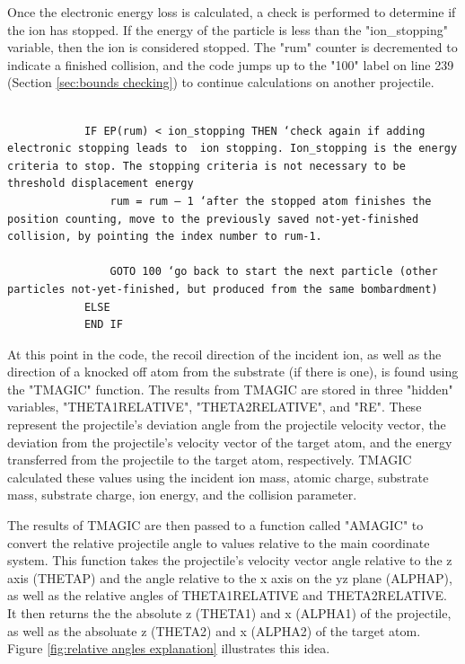 \documentclass[10pt, reqno]{exam}
\begin{document}
Once the electronic energy loss is calculated, a check is performed to determine if the ion has stopped. If the energy of the particle is less than the "ion\_stopping" variable, then the ion is considered stopped. The "rum" counter is decremented to indicate a finished collision, and the code jumps up to the "100" label on line 239 (Section \ref{sec:bounds checking}) to continue calculations on another projectile.

\begin{verbatim}   

            IF EP(rum) < ion_stopping THEN ‘check again if adding electronic stopping leads to  ion stopping. Ion_stopping is the energy criteria to stop. The stopping criteria is not necessary to be threshold displacement energy
                rum = rum – 1 ‘after the stopped atom finishes the position counting, move to the previously saved not-yet-finished collision, by pointing the index number to rum-1. 
    
                GOTO 100 ‘go back to start the next particle (other particles not-yet-finished, but produced from the same bombardment)
            ELSE
            END IF
\end{verbatim}

At this point in the code, the recoil direction of the incident ion, as well as the direction of a knocked off atom from the substrate (if there is one), is found using the "TMAGIC" function. The results from TMAGIC are stored in three "hidden" variables, "THETA1RELATIVE", "THETA2RELATIVE", and "RE". These represent the projectile's deviation angle from the projectile velocity vector, the deviation from the projectile's velocity vector of the target atom, and the energy transferred from the projectile to the target atom, respectively. TMAGIC calculated these values using the incident ion mass, atomic charge, substrate mass, substrate charge, ion energy, and the collision parameter. \par

The results of TMAGIC are then passed to a function called "AMAGIC" to convert the relative projectile angle to values relative to the main coordinate system. This function takes the projectile's velocity vector angle relative to the z axis (THETAP) and the angle relative to the x axis on the yz plane (ALPHAP), as well as the relative angles of THETA1RELATIVE and THETA2RELATIVE. It then returns the the absolute z (THETA1) and x (ALPHA1) of the projectile, as well as the absoluate z (THETA2) and x (ALPHA2) of the target atom. Figure \ref{fig:relative angles explanation} illustrates this idea.
\end{document}
